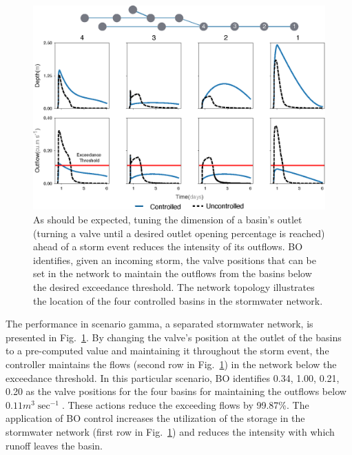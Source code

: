 \begin{figure}[ht]
	\includegraphics[width=\textwidth]{gfx/Chapter-4/performance_gamma.eps}
	\caption{As should be expected, tuning the dimension of a basin's outlet (turning a valve until a desired outlet opening percentage is reached) ahead of a storm event reduces the intensity of its outflows.
	BO identifies, given an incoming storm, the valve positions that can be set in the network to maintain the outflows from the basins below the desired exceedance threshold.
	The network topology illustrates the location of the four controlled basins in the stormwater network.}\label{fig:gamma-4}
\end{figure}

The performance in scenario gamma, a separated stormwater network, is presented in Fig.~\ref{fig:gamma-4}.
By changing the valve's position at the outlet of the basins to a pre-computed value and maintaining it throughout the storm event, the controller maintains the flows (second row in Fig.~\ref{fig:gamma-4}) in the network below the exceedance threshold.
In this particular scenario, BO identifies 0.34, 1.00, 0.21, 0.20 as the  valve positions for the four basins for maintaining the outflows below $0.11 m^3\sec^{-1}$. These actions reduce the exceeding flows by 99.87\%.
The application of BO control increases the utilization of the storage in the stormwater network (first row in Fig.~\ref{fig:gamma-4}) and reduces the intensity with which runoff leaves the basin.


